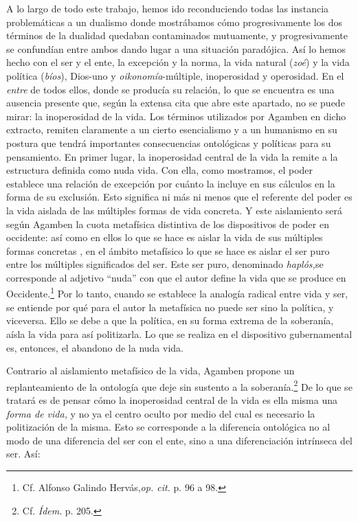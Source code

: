 A lo largo de todo este trabajo, hemos ido reconduciendo todas las instancia problemáticas a un dualismo donde mostrábamos cómo progresivamente los dos términos de la dualidad quedaban contaminados mutuamente, y progresivamente se confundían entre ambos dando lugar a una situación paradójica. Así lo hemos hecho con el ser y el ente, la excepción y la norma, la vida natural (\emph{zoé}) y la vida política (\emph{bíos}), Dios-uno y \emph{oikonomía}-múltiple, inoperosidad y operosidad. En el \emph{entre} de todos ellos, donde se producía su relación, lo que se encuentra es una ausencia presente que, según la extensa cita que abre este apartado, no se puede mirar: la inoperosidad de la vida. Los términos utilizados por Agamben en dicho extracto, remiten claramente a un cierto esencialismo y a un humanismo en su postura que tendrá importantes consecuencias ontológicas y políticas para su pensamiento. En primer lugar, la inoperosidad central de la vida la remite a la estructura definida como nuda vida. Con ella, como mostramos, el poder establece una relación de excepción por cuánto la incluye en sus cálculos en la forma de su exclusión. Esto significa ni más ni menos que el referente del poder es la vida aislada de las múltiples formas de vida concreta. Y este aislamiento será según Agamben la cuota metafísica distintiva de los dispositivos de poder en occidente: así como en ellos lo que se hace es aislar la vida  de sus múltiples formas concretas , en el ámbito metafísico lo que se hace es aislar el ser puro entre los múltiples significados del ser. Este ser puro, denominado \emph{haplós,}se corresponde al adjetivo \enquote{nuda} con que el autor define la vida que se produce en Occidente.\footnote{Cf. Alfonso Galindo Hervás,\emph{op. cit.} p. 96 a 98.} Por lo tanto, cuando se establece la analogía radical entre vida y ser, se entiende por qué para el autor la metafísica no puede ser sino la política, y viceversa. Ello se debe a que la política, en su forma extrema de la soberanía, aísla la vida para así politizarla. Lo que se realiza en el dispositivo gubernamental es, entonces, el abandono de la nuda vida.

Contrario al aislamiento metafísico de la vida, Agamben propone un replanteamiento de la ontología que deje sin sustento a la soberanía.\footnote{Cf. \emph{Ídem}. p. 205.} De lo que se tratará es de pensar cómo la inoperosidad central de la vida es ella misma una \emph{forma de vida,} y no ya el centro oculto por medio del cual es necesario la politización de la misma. Esto se corresponde a la diferencia ontológica no al modo de una diferencia del ser con el ente, sino a una diferenciación intrínseca del ser. Así:

